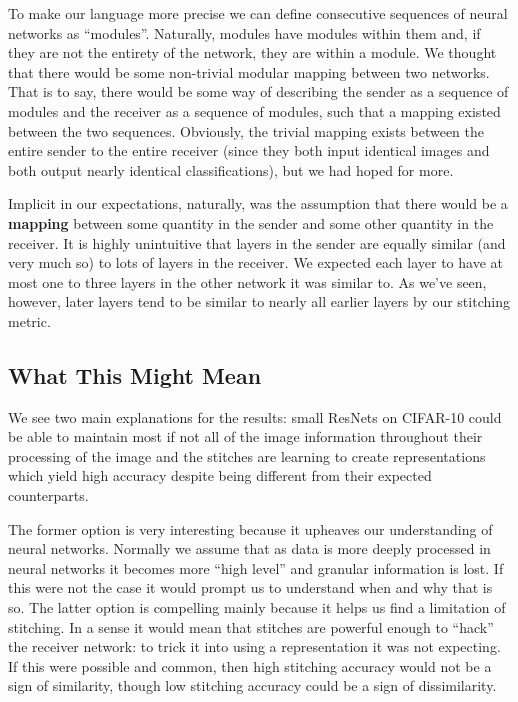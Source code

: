 \documentclass{article} %
\begin{document}
To make our language more precise we can define consecutive sequences of neural networks as ``modules''. Naturally,
modules have modules within them and, if they are not the entirety of the network, they are within a module. We thought
that there would be some non-trivial modular mapping between two networks. That is to say, there would be some way of
describing the sender as a sequence of modules and the receiver as a sequence of modules, such that a mapping existed
between the two sequences. Obviously, the trivial mapping exists between the entire sender to the entire receiver
(since they both input identical images and both output nearly identical classifications), but we had hoped for more.

Implicit in our expectations, naturally, was the assumption that there would be a \textbf{mapping} between some quantity
in the sender and some other quantity in the receiver. It is highly unintuitive that layers in the sender are equally
similar (and very much so) to lots of layers in the receiver. We expected each layer to have at most one to three layers
in the other network it was similar to. As we've seen, however, later layers tend to be similar to nearly all earlier layers
by our stitching metric.

\subsection*{What This Might Mean}
We see two main explanations for the results: small ResNets on CIFAR-10 could be able to maintain most if not all of the image
information throughout their processing of the image and the stitches are learning to create representations which yield high
accuracy despite being different from their expected counterparts.

The former option is very interesting because it upheaves our understanding of neural networks. Normally we assume that
as data is more deeply processed in neural networks it becomes more ``high level'' and granular information is lost. If
this were not the case it would prompt us to understand when and why that is so. The latter option is compelling mainly
because it helps us find a limitation of stitching. In a sense it would mean that stitches are powerful enough to ``hack''
the receiver network: to trick it into using a representation it was not expecting. If this were possible and common, then
high stitching accuracy would not be a sign of similarity, though low stitching accuracy could be a sign of dissimilarity.
\end{document}
